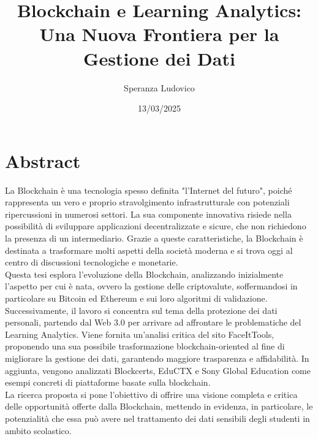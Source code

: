 \documentclass[12pt,a4paper,twoside,openright]{extreport}
\title{Blockchain e Learning Analytics: Una Nuova Frontiera per la Gestione dei Dati}
\author{Speranza Ludovico}
\date{13/03/2025}
\begin{document}
    \pagestyle{empty} %

    
    \cleardoublepage
    
    
    \cleardoublepage

    \pagestyle{plain} %

    \chapter*{Abstract}
    La Blockchain è una tecnologia spesso definita "l’Internet del futuro", poiché rappresenta un vero e proprio stravolgimento infrastrutturale con potenziali ripercussioni in numerosi settori. La sua componente innovativa risiede nella possibilità di sviluppare applicazioni decentralizzate e sicure, che non richiedono la presenza di un intermediario. Grazie a queste caratteristiche, la Blockchain è destinata a trasformare molti aspetti della società moderna e si trova oggi al centro di discussioni tecnologiche e monetarie.
    \\Questa tesi esplora l’evoluzione della Blockchain, analizzando inizialmente l’aspetto per cui è nata, ovvero la gestione delle criptovalute, soffermandosi in particolare su Bitcoin ed Ethereum e sui loro algoritmi di validazione. Successivamente, il lavoro si concentra sul tema della protezione dei dati personali, partendo dal Web 3.0 per arrivare ad affrontare le problematiche del Learning Analytics.
    Viene fornita un’analisi critica del sito FaceItTools, proponendo una sua possibile trasformazione blockchain-oriented al fine di migliorare la gestione dei dati, garantendo maggiore trasparenza e affidabilità. In aggiunta, vengono analizzati Blockcerts, EduCTX e Sony Global Education come esempi concreti di piattaforme basate sulla blockchain.  
    \\La ricerca proposta si pone l'obiettivo di offrire una visione completa e critica delle opportunità offerte dalla Blockchain, mettendo in evidenza, in particolare, le potenzialità che essa può avere nel trattamento dei dati sensibili degli studenti in ambito scolastico.
    \cleardoublepage

    \tableofcontents
    \cleardoublepage
    
    \listoffigures
    \cleardoublepage %
    
    
    \cleardoublepage
    
    \cleardoublepage
    
    \cleardoublepage
    
    \cleardoublepage
    
    \cleardoublepage
    
    \cleardoublepage
    \printbibliography[heading=bibintoc]
\end{document}
